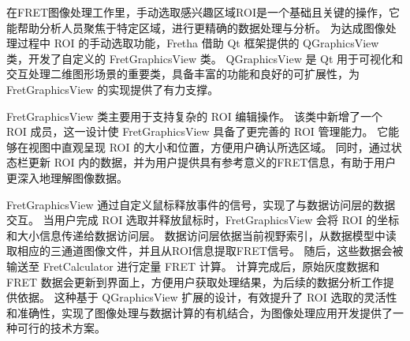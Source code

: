 在FRET图像处理工作里，手动选取感兴趣区域ROI是一个基础且关键的操作，它能帮助分析人员聚焦于特定区域，进行更精确的数据处理与分析。
为达成图像处理过程中 ROI 的手动选取功能，Fretha 借助 Qt 框架提供的 QGraphicsView 类，开发了自定义的 FretGraphicsView 类。
QGraphicsView 是 Qt 用于可视化和交互处理二维图形场景的重要类，具备丰富的功能和良好的可扩展性，为 FretGraphicsView 的实现提供了有力支撑。

FretGraphicsView 类主要用于支持复杂的 ROI 编辑操作。
该类中新增了一个 ROI 成员，这一设计使 FretGraphicsView 具备了更完善的 ROI 管理能力。
它能够在视图中直观呈现 ROI 的大小和位置，方便用户确认所选区域。
同时，通过状态栏更新 ROI 内的数据，并为用户提供具有参考意义的FRET信息，有助于用户更深入地理解图像数据。

FretGraphicsView 通过自定义鼠标释放事件的信号，实现了与数据访问层的数据交互。
当用户完成 ROI 选取并释放鼠标时，FretGraphicsView 会将 ROI 的坐标和大小信息传递给数据访问层。
数据访问层依据当前视野索引，从数据模型中读取相应的三通道图像文件，并且从ROI信息提取FRET信号。
随后，这些数据会被输送至 FretCalculator 进行定量 FRET 计算。
计算完成后，原始灰度数据和 FRET 数据会更新到界面上，方便用户获取处理结果，为后续的数据分析工作提供依据。
这种基于 QGraphicsView 扩展的设计，有效提升了 ROI 选取的灵活性和准确性，实现了图像处理与数据计算的有机结合，为图像处理应用开发提供了一种可行的技术方案。 

